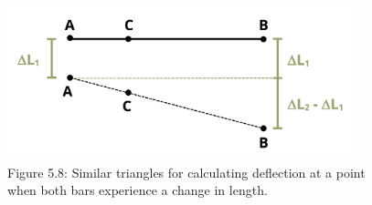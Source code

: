 \documentclass[
  letterpaper,
  DIV=11,
  numbers=noendperiod]{scrreprt}
\begin{document}
\begin{figure}[H]

{\centering \includegraphics[width=3.94792in,height=\textheight]{images/PNGs/Figure 5.9.png}

}

\caption{Figure 5.8: Similar triangles for calculating deflection at a
point when both bars experience a change in length.}

\end{figure}%
\end{document}
